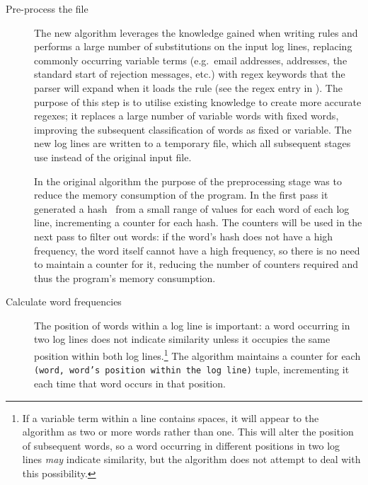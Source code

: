 \begin{description}

    \item [Pre-process the file]  The new algorithm leverages the knowledge
        gained when writing rules and performs a large number of
        substitutions on the input log lines, replacing commonly occurring
        variable terms (e.g.\ email addresses,  addresses, the
        standard start of rejection messages, etc.) with regex keywords
        that the parser will expand when it loads the rule (see the
        regex entry in ).  The purpose of
        this step is to utilise existing knowledge to create more accurate
        regexes; it replaces a large number of variable words with fixed
        words, improving the subsequent classification of words as fixed or
        variable.  The new log lines are written to a temporary file, which
        all subsequent stages use instead of the original input file.

        In the original algorithm the purpose of the preprocessing stage
        was to reduce the memory consumption of the program.  In the first
        pass it generated a hash~\cite{hash-functions} from a small range
        of values for each word of each log line, incrementing a counter
        for each hash.  The counters will be used in the next pass to
        filter out words: if the word's hash does not have a high
        frequency, the word itself cannot have a high frequency, so there
        is no need to maintain a counter for it, reducing the number of
        counters required and thus the program's memory consumption.

    \item [Calculate word frequencies]  The position of words within a log
        line is important: a word occurring in two log lines does not
        indicate similarity unless it occupies the same position within
        both log lines.\footnote{If a variable term within a line contains
        spaces, it will appear to the algorithm as two or more words rather
        than one.  This will alter the position of subsequent words, so a
        word occurring in different positions in two log lines
        \textit{may\/} indicate similarity, but the algorithm does not
        attempt to deal with this possibility.}  The algorithm maintains a
        counter for each \texttt{(word, word's position within the log
        line)} tuple, incrementing it each time that word occurs in that
        position.


\end{description}
